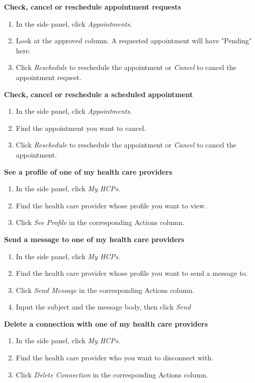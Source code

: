 \documentclass[10pt]{report}
\begin{document}
\textbf{Check, cancel or reschedule appointment requests}
\begin{enumerate}
\item In the side panel, click \textit{ Appointments}.
\item Look at the approved column. A requested appointment will have "Pending" here.
\item Click \textit{Reschedule} to reschedule the appointment or \textit{Cancel} to cancel the appointment request.
\end{enumerate}
\textbf{Check, cancel or reschedule a scheduled appointment}
\begin{enumerate}
\item In the side panel, click \textit{Appointments}.
\item Find the appointment you want to cancel. 
\item Click \textit{Reschedule} to reschedule the appointment or \textit{Cancel} to cancel the appointment.
\end{enumerate}
\textbf{See a profile of one of my health care providers}
\begin{enumerate}
\item In the side panel, click \textit{My HCPs}.
\item Find the health care provider whose profile you want to view.
\item Click \textit{See Profile} in the corresponding Actions column.
\end{enumerate}
\textbf{Send a message to one of my health care providers}
\begin{enumerate}
\item In the side panel, click \textit{My HCPs}.
\item Find the health care provider whose profile you want to send a message to.
\item Click \textit{Send Message} in the corresponding Actions column.
\item Input the subject and the message body, then click \textit{Send}
\end{enumerate}
\textbf{Delete a connection with one of my health care providers}
\begin{enumerate}
\item In the side panel, click \textit{My HCPs}.
\item Find the health care provider who you want to disconnect with.
\item Click \textit{Delete Connection} in the corresponding Actions column.
\end{enumerate}
\end{document}
